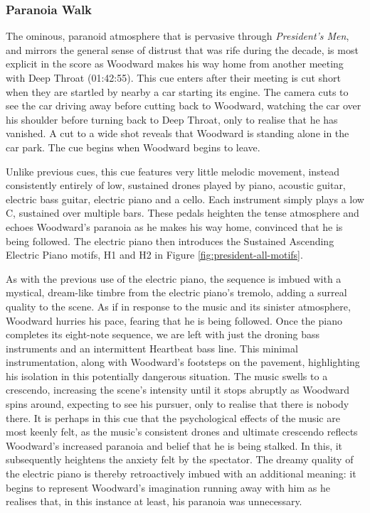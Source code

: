\subsubsection{Paranoia Walk}

The ominous, paranoid atmosphere that is pervasive through \textit{President’s Men}, and mirrors the general sense of distrust that was rife during the decade, is most explicit in the score as Woodward makes his way home from another meeting with Deep Throat (01:42:55).
This cue enters after their meeting is cut short when they are startled by nearby a car starting its engine.
The camera cuts to see the car driving away before cutting back to Woodward, watching the car over his shoulder before turning back to Deep Throat, only to realise that he has vanished.
A cut to a wide shot reveals that Woodward is standing alone in the car park.
The cue begins when Woodward begins to leave.

Unlike previous cues, this cue features very little melodic movement, instead consistently entirely of low, sustained drones played by piano, acoustic guitar, electric bass guitar, electric piano and a cello.
Each instrument simply plays a low C, sustained over multiple bars.
These pedals heighten the tense atmosphere and echoes Woodward's paranoia as he makes his way home, convinced that he is being followed.
The electric piano then introduces the Sustained Ascending Electric Piano motifs, H1 and H2 in Figure \ref{fig:president-all-motifs}.

As with the previous use of the electric piano, the sequence is imbued with a mystical, dream-like timbre from the electric piano's tremolo, adding a surreal quality to the scene.
As if in response to the music and its sinister atmosphere, Woodward hurries his pace, fearing that he is being followed.
Once the piano completes its eight-note sequence, we are left with just the droning bass instruments and an intermittent Heartbeat bass line.
This minimal instrumentation, along with Woodward’s footsteps on the pavement, highlighting his isolation in this potentially dangerous situation.
The music swells to a crescendo, increasing the scene's intensity until it stops abruptly as Woodward spins around, expecting to see his pursuer, only to realise that there is nobody there.
It is perhaps in this cue that the psychological effects of the music are most keenly felt, as the music's consistent drones and ultimate crescendo reflects Woodward's increased paranoia and belief that he is being stalked.
In this, it subsequently heightens the anxiety felt by the spectator.
The dreamy quality of the electric piano is thereby retroactively imbued with an additional meaning: it begins to represent Woodward’s imagination running away with him as he realises that, in this instance at least, his paranoia was unnecessary.

